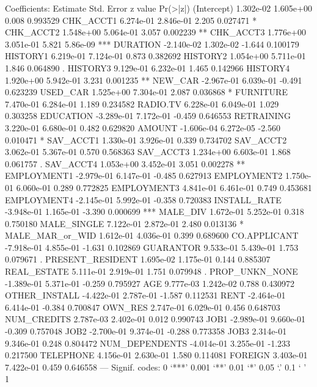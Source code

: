 \documentclass{article}
\begin{document}
\begin{Schunk}
\begin{Soutput}
Coefficients:
                   Estimate Std. Error z value Pr(>|z|)    
(Intercept)       1.302e-02  1.605e+00   0.008 0.993529    
CHK_ACCT1         6.274e-01  2.846e-01   2.205 0.027471 *  
CHK_ACCT2         1.548e+00  5.064e-01   3.057 0.002239 ** 
CHK_ACCT3         1.776e+00  3.051e-01   5.821 5.86e-09 ***
DURATION         -2.140e-02  1.302e-02  -1.644 0.100179    
HISTORY1          6.219e-01  7.124e-01   0.873 0.382692    
HISTORY2          1.054e+00  5.711e-01   1.846 0.064890 .  
HISTORY3          9.129e-01  6.232e-01   1.465 0.142966    
HISTORY4          1.920e+00  5.942e-01   3.231 0.001235 ** 
NEW_CAR          -2.967e-01  6.039e-01  -0.491 0.623239    
USED_CAR          1.525e+00  7.304e-01   2.087 0.036868 *  
FURNITURE         7.470e-01  6.284e-01   1.189 0.234582    
RADIO.TV          6.228e-01  6.049e-01   1.029 0.303258    
EDUCATION        -3.289e-01  7.172e-01  -0.459 0.646553    
RETRAINING        3.220e-01  6.680e-01   0.482 0.629820    
AMOUNT           -1.606e-04  6.272e-05  -2.560 0.010471 *  
SAV_ACCT1         1.330e-01  3.926e-01   0.339 0.734702    
SAV_ACCT2         3.062e-01  5.367e-01   0.570 0.568363    
SAV_ACCT3         1.234e+00  6.603e-01   1.868 0.061757 .  
SAV_ACCT4         1.053e+00  3.452e-01   3.051 0.002278 ** 
EMPLOYMENT1      -2.979e-01  6.147e-01  -0.485 0.627913    
EMPLOYMENT2       1.750e-01  6.060e-01   0.289 0.772825    
EMPLOYMENT3       4.841e-01  6.461e-01   0.749 0.453681    
EMPLOYMENT4      -2.145e-01  5.992e-01  -0.358 0.720383    
INSTALL_RATE     -3.948e-01  1.165e-01  -3.390 0.000699 ***
MALE_DIV          1.672e-01  5.252e-01   0.318 0.750180    
MALE_SINGLE       7.122e-01  2.872e-01   2.480 0.013136 *  
MALE_MAR_or_WID   1.612e-01  4.036e-01   0.399 0.689600    
CO.APPLICANT     -7.918e-01  4.855e-01  -1.631 0.102869    
GUARANTOR         9.533e-01  5.439e-01   1.753 0.079671 .  
PRESENT_RESIDENT  1.695e-02  1.175e-01   0.144 0.885307    
REAL_ESTATE       5.111e-01  2.919e-01   1.751 0.079948 .  
PROP_UNKN_NONE   -1.389e-01  5.371e-01  -0.259 0.795927    
AGE               9.777e-03  1.242e-02   0.788 0.430972    
OTHER_INSTALL    -4.422e-01  2.787e-01  -1.587 0.112531    
RENT             -2.464e-01  6.414e-01  -0.384 0.700847    
OWN_RES           2.747e-01  6.029e-01   0.456 0.648703    
NUM_CREDITS       2.787e-03  2.402e-01   0.012 0.990743    
JOB1             -2.989e-01  9.660e-01  -0.309 0.757048    
JOB2             -2.700e-01  9.374e-01  -0.288 0.773358    
JOB3              2.314e-01  9.346e-01   0.248 0.804472    
NUM_DEPENDENTS   -4.014e-01  3.255e-01  -1.233 0.217500    
TELEPHONE         4.156e-01  2.630e-01   1.580 0.114081    
FOREIGN           3.403e-01  7.422e-01   0.459 0.646558    
---
Signif. codes:  0 ‘***’ 0.001 ‘**’ 0.01 ‘*’ 0.05 ‘.’ 0.1 ‘ ’ 1


\end{Soutput}
\end{Schunk}
\end{document}
